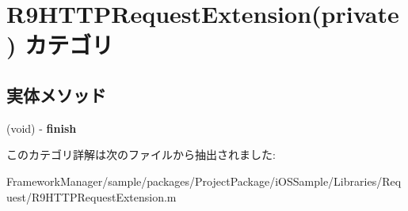 \hypertarget{category_r9_h_t_t_p_request_extension_07private_08}{}\section{R9\+H\+T\+T\+P\+Request\+Extension(private) カテゴリ}
\label{category_r9_h_t_t_p_request_extension_07private_08}
\subsection*{実体メソッド}
\begin{DoxyCompactItemize}
\item 
\hypertarget{category_r9_h_t_t_p_request_extension_07private_08_a97173e30a4fcf8e82f24a335b568f8b0}{}(void) -\/ {\bfseries finish}\label{category_r9_h_t_t_p_request_extension_07private_08_a97173e30a4fcf8e82f24a335b568f8b0}

\end{DoxyCompactItemize}


このカテゴリ詳解は次のファイルから抽出されました\+:\begin{DoxyCompactItemize}
\item 
Framework\+Manager/sample/packages/\+Project\+Package/i\+O\+S\+Sample/\+Libraries/\+Request/R9\+H\+T\+T\+P\+Request\+Extension.\+m\end{DoxyCompactItemize}
